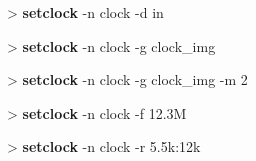\documentclass[10pt,a4paper]{article}
\begin{document}
\begin{sampletitle}[1]
> \textbf{\tool{} setclock} -n clock -d in
\end{sampletitle}

\begin{sampletitle}[2]
> \textbf{\tool{} setclock} -n clock -g clock\_img
\end{sampletitle}

\begin{sampletitle}[3]
> \textbf{\tool{} setclock} -n clock -g clock\_img -m 2
\end{sampletitle}

\begin{sampletitle}[4]
> \textbf{\tool{} setclock} -n clock -f 12.3M
\end{sampletitle}

\begin{sampletitle}[5]
> \textbf{\tool{} setclock} -n clock -r 5.5k:12k
\end{sampletitle}
\end{document}
